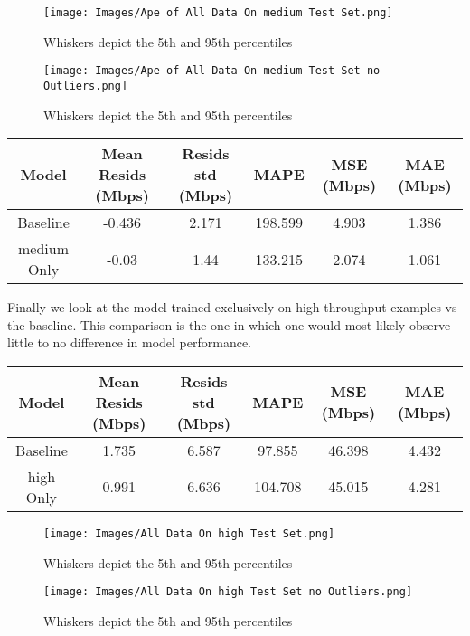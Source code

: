 \begin{figure}[h]
\texttt{[image: Images/Ape of All Data On medium Test Set.png]}
\centering
\caption{Whiskers depict the 5th and 95th percentiles}
\label{fig:std_all_medium_ape_outliers}
\end{figure}

\begin{figure}[h]
\texttt{[image: Images/Ape of All Data On medium Test Set no Outliers.png]}
\centering
\caption{Whiskers depict the 5th and 95th percentiles}
\label{fig:std_all_medium_ape}
\end{figure}

\begin{table}[!htb]
\centering
\begin{tabular}{|c|c|c|c|c|c|}
\hline
{Model} & {Mean Resids (Mbps)} & {Resids std (Mbps)} & {MAPE} & {MSE (Mbps)} & {MAE (Mbps)}\\
\hline
Baseline & -0.436 & 2.171 & 198.599 & 4.903 & 1.386\\
\hline
medium Only & -0.03 & 1.44 & 133.215 & 2.074 & 1.061\\
\hline
\end{tabular}
\label{tab:std_all_medium}
\end{table}

\newpage
Finally we look at the model trained exclusively on high throughput examples vs the baseline. This comparison is the one in which one would most likely observe little to no difference in model performance. 

\begin{table}[h]
\centering
\begin{tabular}{|c|c|c|c|c|c|}
\hline
{Model} & {Mean Resids (Mbps)} & {Resids std (Mbps)} & {MAPE} & {MSE (Mbps)} & {MAE (Mbps)}\\
\hline
Baseline & 1.735 & 6.587 & 97.855 & 46.398 & 4.432\\
\hline
high Only & 0.991 & 6.636 & 104.708 & 45.015 & 4.281\\
\hline
\end{tabular}
\label{tab:std_all_high}
\end{table}

\begin{figure}[h]
\texttt{[image: Images/All Data On high Test Set.png]}
\centering
\caption{Whiskers depict the 5th and 95th percentiles}
\label{fig:std_all_high_resids_outliers}
\end{figure}

\begin{figure}[h]
\texttt{[image: Images/All Data On high Test Set no Outliers.png]}
\centering
\caption{Whiskers depict the 5th and 95th percentiles}
\label{fig:std_all_high_resids}
\end{figure}

